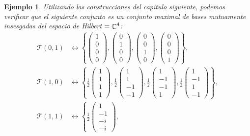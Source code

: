\documentclass[a4paper]{report}
\DeclareMathOperator{\C}{\mathbb{C}}
\let\H\relax
\DeclareMathOperator{\H}{\mathcal H}
\newtheorem{example}{Ejemplo}
\begin{document}
\begin{example}
    Utilizando las construcciones del capítulo siguiente,
    podemos verificar que el siguiente conjunto es un
    conjunto maximal de bases mutuamente insesgadas del
    espacio de Hilbert $\H = \C^{4}$:
    \begin{align}
      \mathcal T(0,1) &\leftrightarrow \left\{
      \begin{pmatrix} 1\\0\\0\\0 \end{pmatrix},
      \begin{pmatrix} 0\\1\\0\\0 \end{pmatrix},
      \begin{pmatrix} 0\\0\\1\\0 \end{pmatrix},
      \begin{pmatrix} 0\\0\\0\\1 \end{pmatrix}
      \right\}, \\
      \mathcal T(1,0) &\leftrightarrow \left\{
      \frac{1}{2} \begin{pmatrix} 1\\1\\1\\1 \end{pmatrix}, 
      \frac{1}{2} \begin{pmatrix} 1\\1\\-1\\-1 \end{pmatrix}, 
      \frac{1}{2} \begin{pmatrix} 1\\-1\\-1\\1 \end{pmatrix},
      \frac{1}{2} \begin{pmatrix} 1\\-1\\1\\-1 \end{pmatrix} 
      \right\}, \\
      \mathcal T(1,1) &\leftrightarrow \left\{
      \frac{1}{2} \begin{pmatrix} 1\\-1\\-i\\-i \end{pmatrix}, 

\end{align}
\end{example}
\end{document}
